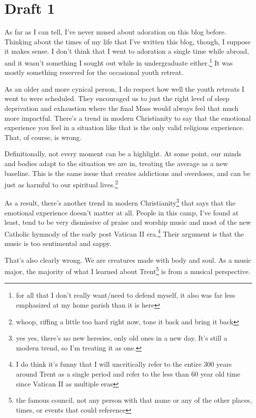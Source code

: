 \documentclass[12pt]{article}[titlepage]
\newcommand{\1}{\={a}}
\newcommand{\2}{\={e}}
\newcommand{\3}{\={\i}}
\newcommand{\4}{\=o}
\newcommand{\5}{\=u}
\newcommand{\6}{\={A}}
\renewcommand{\,}{\textsuperscript{,}}
\begin{document}
\section{Draft 1} 
As far as I can tell, I've never mused about adoration on this blog before.
Thinking about the times of my life that I've written this blog, though, I suppose it makes sense.
I don't think that I went to adoration a single time while abroad, and it wasn't something I sought out while in undergraduate either.\footnote{for all that I don't really want/need to defend myself, it also was far less emphasized at my home parish than it is here}
It was mostly something reserved for the occasional youth retreat.
 
As an older and more cynical person, I do respect how well the youth retreats I went to were scheduled.
They encouraged us to just the right level of sleep deprivation and exhaustion where the final Mass would always feel that much more impactful.
There's a trend in modern Christianity to say that the emotional experience you feel in a situation like that is the only valid religious experience.
That, of course, is wrong.
 
Definitionally, not every moment can be a highlight.
At some point, our minds and bodies adapt to the situation we are in, treating the average as a new baseline.
This is the same issue that creates addictions and overdoses, and can be just as harmful to our spiritual lives.\footnote{whoop, riffing a little too hard right now, tone it back and bring it back}
 
As a result, there's another trend in modern Christianity\footnote{yes yes, there's no new heresies, only old ones in a new day. It's still a modern trend, so I'm treating it as one.} that says that the emotional experience doesn't matter at all.
People in this camp, I've found at least, tend to be very dismissive of praise and worship music and most of the new Catholic hymnody of the early post Vatican II era.\footnote{I do think it's funny that I will uncritically refer to the entire 300 years around Trent as a single period and refer to the less than 60 year old time since Vatican II as multiple eras}
Their argument is that the music is too sentimental and sappy.
 
That's also clearly wrong.
We are creatures made with body and soul.
As a music major, the majority of what I learned about Trent\footnote{the famous council, not any person with that name or any of the other places, times, or events that could reference} is from a musical perspective.
 
\end{document}
